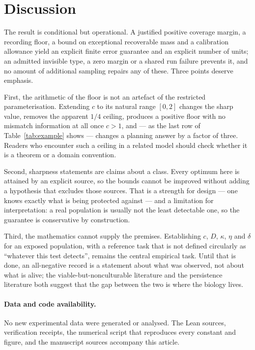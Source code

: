\documentclass[11pt]{article}
\theoremstyle{definition}
\theoremstyle{remark}
\begin{document}
\section{Discussion}\label{sec:discussion}

The result is conditional but operational. A justified positive coverage margin,
a recording floor, a bound on exceptional recoverable mass and a calibration
allowance yield an explicit finite error guarantee and an explicit number of
units; an admitted invisible type, a zero margin or a shared run failure
prevents it, and no amount of additional sampling repairs any of these. Three
points deserve emphasis.

First, the arithmetic of the floor is not an artefact of the restricted
parameterisation. Extending $c$ to its natural range $[0,2]$ changes the sharp
value, removes the apparent $1/4$ ceiling, produces a positive floor with no
mismatch information at all once $c>1$, and --- as the last row of
Table~\ref{tab:example} shows --- changes a planning answer by a factor of three.
Readers who encounter such a ceiling in a related model should check whether it
is a theorem or a domain convention.

Second, sharpness statements are claims about a class. Every optimum here is
attained by an explicit source, so the bounds cannot be improved without adding
a hypothesis that excludes those sources. That is a strength for design --- one
knows exactly what is being protected against --- and a limitation for
interpretation: a real population is usually not the least detectable one, so
the guarantee is conservative by construction.

Third, the mathematics cannot supply the premises. Establishing $c$, $D$,
$\kappa$, $\eta$ and $\delta$ for an exposed population, with a reference task
that is not defined circularly as ``whatever this test detects'', remains the
central empirical task. Until that is done, an all-negative record is a statement
about what was observed, not about what is alive; the viable-but-nonculturable
literature \citep{oliver2010} and the persistence literature
\citep{balaban2004,balaban2019} both suggest that the gap between the two is
where the biology lives.

\paragraph{Data and code availability.}
No new experimental data were generated or analysed. The Lean sources,
verification receipts, the numerical script that reproduces every constant and
figure, and the manuscript sources accompany this article.



\end{document}
